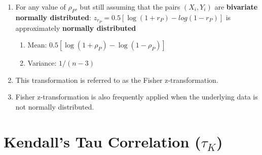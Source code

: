 \begin{enumerate}[itemsep=0.2cm]
    \item For any value of $\rho_P$, but still assuming that the pairs $(X_i, Y_i)$ are \textbf{bivariate normally distributed}: $z_{r_P} = 0.5[\log(1 + r_P ) - log(1 - r_P )]$ is approximately \textbf{normally distributed}

    \begin{enumerate}
        \item Mean: $0.5[\log(1 + \rho_P ) - \log(1 - \rho_P )]$

        \item Variance: $1/(n - 3)$ 

    \end{enumerate}

    \item This transformation is referred to as the Fisher z-transformation.

    \item Fisher z-transformation is also frequently applied when the underlying data is not normally distributed.    

\end{enumerate}


\section{Kendall’s Tau Correlation ($\tau_K$) \cite{ism-1}} \label{Multivariate Distributions: Kendall’s Tau Correlation}

